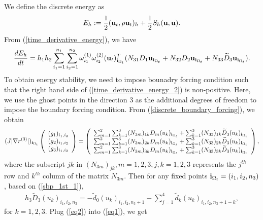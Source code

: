 \documentclass[a4paper]{article}
\newcommand{\wt}{\widetilde}
\begin{document}
We define the discrete energy as
\begin{equation*}
E_h := \frac{1}{2}({\bf u}_t, \rho{\bf u}_t)_h + \frac{1}{2}S_h({\bf u},{\bf u}).
\end{equation*}
From (\ref{time_derivative_energy}), we have
\begin{equation}\label{time_derivative_energy_2}
\frac{dE_h}{dt} = h_1h_2\sum_{{i_1}=1}^{n_1}\sum_{{i_2}=1}^{n_2}\omega_{i_1}^{(1)}\omega_{i_2}^{(2)}({\bf u}_t)_{{\bf i}_{\Omega_t}}^T(N_{31}D_1{\bf u}_{{\bf i}_{\Omega_t}} + N_{32}D_2{\bf u}_{{\bf i}_{\Omega_t}} +N_{33}\wt{D}_3{\bf u}_{{\bf i}_{\Omega_t}}).
\end{equation}
To obtain energy stability, we need to impose bounadry forcing condition such that the right hand side of (\ref{time_derivative_energy_2}) is non-positive. Here, we use the ghost points in the direction $3$ as the additional degrees of freedom to impose the boundary forcing condition. From (\ref{discrete_boundary_forcing}), we obtain
\begin{equation}\label{eq1}
(J|\nabla r^{(3)}|)_{{\bf i}_{\Omega_t}} \left(\begin{array}{c}
(g_1)_{i_1,i_2} \\
(g_2)_{i_1,i_2}\\
(g_3)_{i_1,i_2}\end{array}\right) = \left(\begin{array}{c}
\sum_{m=1}^2\sum_{k=1}^3(N_{3m})_{1k}D_m(u_k)_{{\bf i}_{\Omega_t}} +\sum_{k=1}^3(N_{33})_{1k}\wt{D}_3(u_k)_{{\bf i}_{\Omega_t}}\\
\sum_{m=1}^2\sum_{k=1}^3(N_{3m})_{2k}D_m(u_k)_{{\bf i}_{\Omega_t}} 
+\sum_{k=1}^3(N_{33})_{2k}\wt{D}_3(u_k)_{{\bf i}_{\Omega_t}} \\
\sum_{m=1}^2\sum_{k=1}^3(N_{3m})_{3k}D_m(u_k)_{{\bf i}_{\Omega_t}}
+\sum_{k=1}^3(N_{33})_{3k}\wt{D}_3(u_k)_{{\bf i}_{\Omega_t}}
\end{array}\right),
\end{equation}
where the subscript $jk$ in $(N_{3m})_{jk}, m = 1,2,3, j,k = 1,2,3$ represents the $j^{th}$ row and $k^{th}$ column of the matrix $N_{3m}$. Then for any fixed points ${\bf i}_{\Omega_t} = (i_1,i_2,n_3)$, based on (\ref{sbp_1st_1}),
\begin{align}\label{eq2}
h_3 \tilde{D}_3(u_k)_{i_1,i_2,n_3} = -\tilde{d}_0 (u_k)_{i_1,i_2,n_3+1} - \sum_{j = 1}^4  \tilde{d}_k (u_k)_{i_1,i_2,n_3+1-k},
\end{align}
for $k = 1,2,3$. Plug (\ref{eq2}) into (\ref{eq1}), we get
\end{document}
